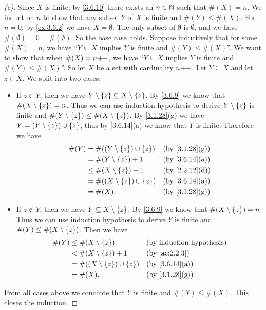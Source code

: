 \begin{proof}[(c)]
	Since \(X\) is finite, by \cref{3.6.10} there exists an \(n \in \mathbb{N}\) such that \(\#(X) = n\).
	We induct on \(n\) to show that any subset \(Y\) of \(X\) is finite and \(\#(Y) \leq \#(X)\).
	For \(n = 0\), by \cref{ex:3.6.2} we have \(X = \emptyset\).
	The only subset of \(\emptyset\) is \(\emptyset\), and we have \(\#(\emptyset) = 0 = \#(\emptyset)\).
	So the base case holds.
	Suppose inductively that for some \(\#(X) = n\), we have ``\(Y \subseteq X\) implies \(Y\) is finite and \(\#(Y) \leq \#(X)\)''.
	We want to show that when \(\#(X) = n\!+\!\!+\), we have ``\(Y \subseteq X\) implies \(Y\) is finite and \(\#(Y) \leq \#(X)\)''.
	So let \(X\) be a set with cardinality \(n\!+\!\!+\).
	Let \(Y \subseteq X\) and let \(z \in X\).
	We split into two cases:
	\begin{itemize}
		\item If \(z \in Y\), then we have \(Y \setminus \left\lbrace z\right\rbrace \subseteq X \setminus \left\lbrace z\right\rbrace\).
		      By \cref{3.6.9} we know that \(\#(X \setminus \left\lbrace z\right\rbrace) = n\).
		      Thus we can use induction hypothesis to derive \(Y \setminus \left\lbrace z\right\rbrace\) is finite and \(\#(Y \setminus \left\lbrace z\right\rbrace) \leq \#(X \setminus \left\lbrace z\right\rbrace)\).
		      By \cref{3.1.28}(g) we have \(Y = (Y \setminus \left\lbrace z\right\rbrace) \cup \left\lbrace z\right\rbrace\), thus by \cref{3.6.14}(a) we know that \(Y\) is finite.
		      Therefore we have
		      \begin{align*}
			      \#(Y) & = \#((Y \setminus \set{z}) \cup \set{z}) &  & \by{3.1.28}[g] \\
			            & = \#(Y \setminus \set{z}) + 1            &  & \by{3.6.14}[a] \\
			            & \leq \#(X \setminus \set{z}) + 1         &  & \by{2.2.12}[d] \\
			            & = \#((X \setminus \set{z}) \cup \set{z}) &  & \by{3.6.14}[a] \\
			            & = \#(X).                                 &  & \by{3.1.28}[g]
		      \end{align*}
		\item If \(z \notin Y\), then we have \(Y \subseteq X \setminus \left\lbrace z\right\rbrace\).
		      By \cref{3.6.9} we know that \(\#(X \setminus \left\lbrace z\right\rbrace) = n\).
		      Thus we can use induction hypothesis to derive \(Y\) is finite and \(\#(Y) \leq \#(X \setminus \left\lbrace z\right\rbrace)\).
		      Then we have
		      \begin{align*}
			      \#(Y) & \leq \#(X \setminus \set{z})             &  & \byIH          \\
			            & < \#(X \setminus \set{z}) + 1            &  & \by{ac:2.2.3}  \\
			            & = \#((X \setminus \set{z}) \cup \set{z}) &  & \by{3.6.14}[a] \\
			            & = \#(X).                                 &  & \by{3.1.28}[g]
		      \end{align*}
	\end{itemize}
	From all cases above we conclude that \(Y\) is finite and \(\#(Y) \leq \#(X)\).
	This closes the induction.


\end{proof}
